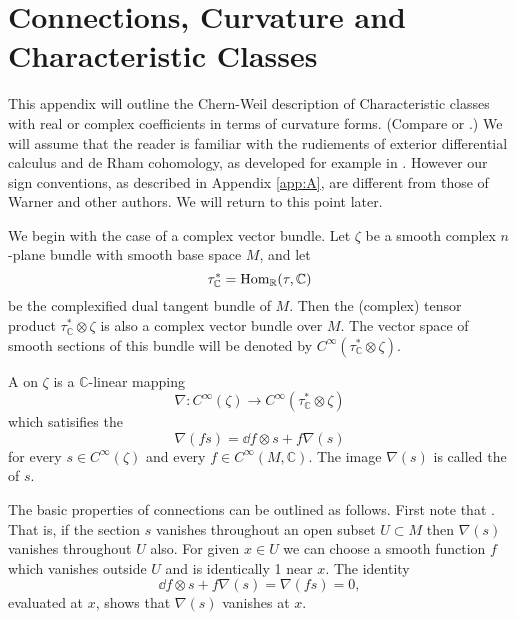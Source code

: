 \documentclass[../main]{subfiles}
\begin{document}
\chapter{Connections, Curvature and Characteristic Classes}\label{app:C}
This appendix will outline the Chern-Weil description of Characteristic classes with real or complex coefficients in terms of curvature forms. (Compare \cite{chern1948} or \cite[Section 2]{bott-chern}.) We will assume that the reader is familiar with the rudiements of exterior differential calculus and de Rham cohomology, as developed for example in \cite{warner2013foundations}. However our sign conventions, as described in Appendix \ref{app:A}, are different from those of Warner and other authors. We will return to this point later.

We begin with the case of a complex vector bundle. Let $\zeta$ be a smooth complex $n$-plane bundle with smooth base space $M$, and let 
\[
\tau^{*}_{\mathbb{C}} = \operatorname{Hom}_{\mathbb{R}}(\tau,\mathbb{C})
\]
be the complexified dual tangent bundle of $M$. Then the (complex) tensor product $\tau_{\mathbb{C}}^{*} \otimes \zeta$ is also a complex vector bundle over $M$. The vector space of smooth sections of this bundle will be denoted by $C^{\infty}(\tau_{\mathbb{C}}^{*} \otimes \zeta)$.

\begin{definition}
A  on $\zeta$ is a $\mathbb{C}$-linear mapping
\[ \nabla : C^\infty (\zeta) \rightarrow C^\infty (\tau_{\mathbb{C}}^* \otimes \zeta) \]
which satisifies the 
\[\nabla(fs) = \dd f \otimes s + f\nabla(s) \]
for every $s \in C^\infty (\zeta)$ and every $f \in C^\infty (M,\mathbb{C})$.  The image $\nabla(s)$ is called the  of $s$.
\end{definition}

The basic properties of connections can be outlined as follows. First note that . That is, if the section $s$ vanishes throughout an open subset $U \subset M$ then $\nabla(s)$ vanishes throughout $U$ also. For given $x \in U$ we can choose a smooth function $f$ which vanishes outside $U$ and is identically 1 near $x$. The identity
\[\dd f \otimes s + f\nabla(s)=\nabla(fs)=0,\]
evaluated at $x$, shows that $\nabla(s)$ vanishes at $x$.
\end{document}
